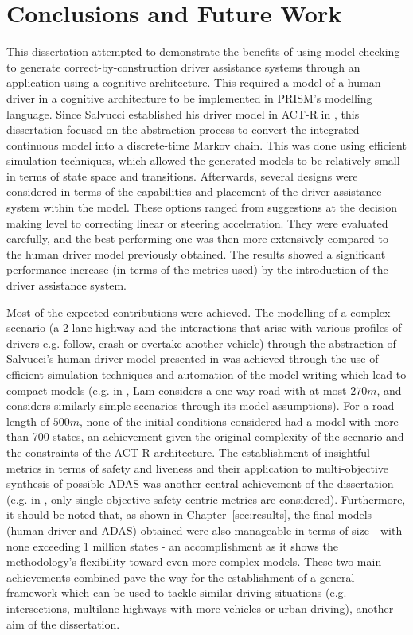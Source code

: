 \chapter{Conclusions and Future Work}
\label{sec:conclusion}

This dissertation attempted to demonstrate the benefits of using model checking to generate correct-by-construction driver assistance systems through an application using a cognitive architecture. This required a model of a human driver in a cognitive architecture to be implemented in PRISM's modelling language. Since Salvucci established his driver model in ACT-R in \cite{salvucci_1}, this dissertation focused on the abstraction process to convert the integrated continuous model into a discrete-time Markov chain. This was done using efficient simulation techniques, which allowed the generated models to be relatively small in terms of state space and transitions. Afterwards, several designs were considered in terms of the capabilities and placement of the driver assistance system within the model. These options ranged from suggestions at the decision making level to correcting linear or steering acceleration. They were evaluated carefully, and the best performing one was then more extensively compared to the human driver model previously obtained. The results showed a significant performance increase (in terms of the metrics used) by the introduction of the driver assistance system.

Most of the expected contributions were achieved. The modelling of a complex scenario (a 2-lane highway and the interactions that arise with various profiles of drivers e.g. follow, crash or overtake another vehicle) through the abstraction of Salvucci's human driver model presented in \cite{salvucci_1} was achieved through the use of efficient simulation techniques and automation of the model writing which lead to compact models (e.g. in \cite{lam}, Lam considers a one way road with at most $270m$, and \cite{games} considers similarly simple scenarios through its model assumptions). For a road length of $500m$, none of the initial conditions considered had a model with more than 700 states, an achievement given the original complexity of the scenario and the constraints of the ACT-R architecture. The establishment of insightful metrics in terms of safety and liveness and their application to multi-objective synthesis of possible ADAS was another central achievement of the dissertation (e.g. in \cite{lam}, only single-objective safety centric metrics are considered). Furthermore, it should be noted that, as shown in Chapter~\ref{sec:results}, the final models (human driver and ADAS) obtained were also manageable in terms of size - with none exceeding 1 million states - an accomplishment as it shows the methodology's flexibility toward even more complex models. These two main achievements combined pave the way for the establishment of a general framework which can be used to tackle similar driving situations (e.g. intersections, multilane highways with more vehicles or urban driving), another aim of the dissertation. 

